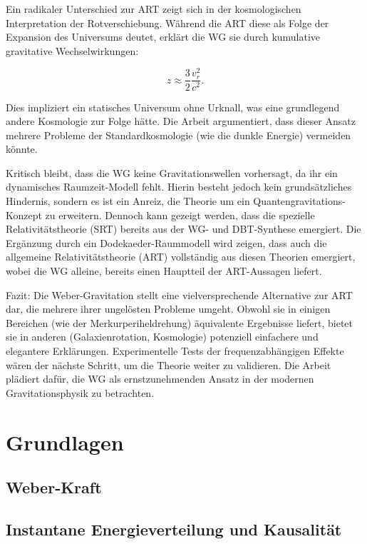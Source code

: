 \documentclass[10pt,oneside,openright]{book} %
\numberwithin{equation}{section}
\begin{document}
Ein radikaler Unterschied zur ART zeigt sich in der kosmologischen Interpretation der Rotverschiebung. Während die ART diese als Folge der Expansion des Universums deutet,
erklärt die WG sie durch kumulative gravitative Wechselwirkungen:

\[
z \approx \frac{3}{2} \frac{v_r^2}{c^2}.
\]  

Dies impliziert ein statisches Universum ohne Urknall, was eine grundlegend andere Kosmologie zur Folge hätte. Die Arbeit argumentiert, dass dieser Ansatz mehrere Probleme
der Standardkosmologie (wie die dunkle Energie) vermeiden könnte.  

Kritisch bleibt, dass die WG keine Gravitationswellen vorhersagt, da ihr ein dynamisches Raumzeit-Modell fehlt. Hierin besteht jedoch kein grundsätzliches Hindernis,
sondern es ist ein Anreiz, die Theorie um ein Quantengravitations-Konzept zu erweitern. Dennoch kann gezeigt werden, dass die spezielle Relativitätstheorie (SRT)
bereits aus der WG- und DBT-Synthese emergiert. Die Ergänzung durch ein Dodekaeder-Raummodell wird zeigen, dass auch die allgemeine Relativitätstheorie (ART) vollständig aus diesen
Theorien emergiert, wobei die WG alleine, bereits einen Hauptteil der ART-Aussagen liefert.

Fazit: Die Weber-Gravitation stellt eine vielversprechende Alternative zur ART dar, die mehrere ihrer ungelösten Probleme umgeht. Obwohl sie in einigen Bereichen
(wie der Merkurperiheldrehung) äquivalente Ergebnisse liefert, bietet sie in anderen (Galaxienrotation, Kosmologie) potenziell einfachere und elegantere Erklärungen.
Experimentelle Tests der frequenzabhängigen Effekte wären der nächste Schritt, um die Theorie weiter zu validieren. Die Arbeit plädiert dafür, die WG als
ernstzunehmenden Ansatz in der modernen Gravitationsphysik zu betrachten.

\tableofcontents

\part{Grundlagen}
\chapter{Weber-Kraft}
\label{chapter:weber_kraft}





\chapter{Instantane Energieverteilung und Kausalität}

\end{document}
